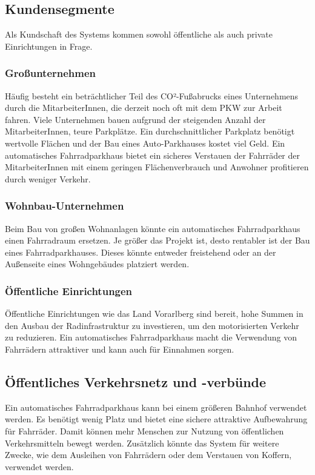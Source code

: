 \subsection{Kundensegmente}
Als Kundschaft des Systems kommen sowohl öffentliche als auch private Einrichtungen in Frage.

\subsubsection{Großunternehmen}
Häufig besteht ein beträchtlicher Teil des CO²-Fußabrucks eines Unternehmens durch die MitarbeiterInnen, die derzeit noch oft mit dem PKW zur Arbeit fahren. Viele Unternehmen bauen aufgrund der steigenden Anzahl der MitarbeiterInnen, teure Parkplätze. Ein durchschnittlicher Parkplatz benötigt wertvolle Flächen und der Bau eines Auto-Parkhauses kostet viel Geld. Ein automatisches Fahrradparkhaus bietet ein sicheres Verstauen der Fahrräder der MitarbeiterInnen mit einem geringen Flächenverbrauch und Anwohner profitieren durch weniger Verkehr.

\subsubsection{Wohnbau-Unternehmen}
Beim Bau von großen Wohnanlagen könnte ein automatisches Fahrradparkhaus einen Fahrradraum ersetzen. Je größer das Projekt ist, desto rentabler ist der Bau eines Fahrradparkhauses. Dieses könnte entweder freistehend oder an der Außenseite eines Wohngebäudes platziert werden.

\subsubsection{Öffentliche Einrichtungen}
Öffentliche Einrichtungen wie das Land Vorarlberg sind bereit, hohe Summen in den Ausbau der Radinfrastruktur zu investieren, um den motorisierten Verkehr zu reduzieren. Ein automatisches Fahrradparkhaus macht die Verwendung von Fahrrädern attraktiver und kann auch für Einnahmen sorgen.

\subsection{Öffentliches Verkehrsnetz und -verbünde}
Ein automatisches Fahrradparkhaus kann bei einem größeren Bahnhof verwendet werden. Es benötigt wenig Platz und bietet eine sichere attraktive Aufbewahrung für Fahrräder. Damit können mehr Menschen zur Nutzung von öffentlichen Verkehrsmitteln bewegt werden. Zusätzlich könnte das System für weitere Zwecke, wie dem Ausleihen von Fahrrädern oder dem Verstauen von Koffern, verwendet werden.


